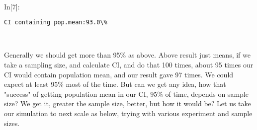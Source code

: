 \documentclass[float=false,crop=false]{standalone}
\begin{document}
    
    \begin{center}
    \end{center}
    { \hspace*{\fill} \\}
    \begin{InVerbatim}[commandchars=\\\{\},fontsize=\scriptsize]
{\color{incolor}In[{\color{incolor}7}]:}    
        
            
        
          
\end{InVerbatim}
    \begin{Verbatim}[commandchars=\\\{\},fontsize=\footnotesize]
CI containing pop.mean:93.0\%

    \end{Verbatim}

    \begin{center}
    \end{center}
    { \hspace*{\fill} \\}
    
    Generally we should get more than 95\% as above. Above result just
means, if we take a sampling size, and calculate CI, and do that 100
times, about 95 times our CI would contain population mean, and our
result gave 97 times. We could expect at least 95\% most of the time.
But can we get any idea, how that "success" of getting population mean
in our CI, 95\% of time, depends on sample size? We get it, greater the
sample size, better, but how it would be? Let us take our simulation to
next scale as below, trying with various experiment and sample sizes.
\end{document}
